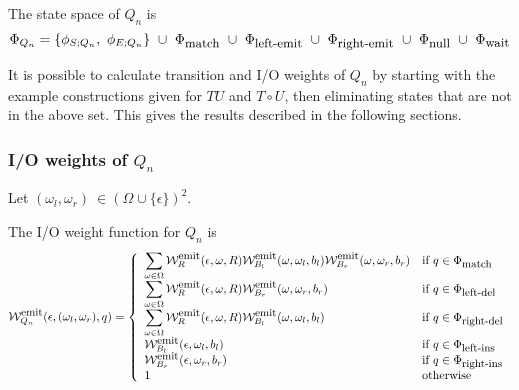 \documentclass{article}
\newcommand\gappedalphabet[1]{(\Omega_{#1} \cup \{\epsilon\})}
\newcommand\gapsquared{\gappedalphabet{}^2}
\newcommand\compose{}
\newcommand\fork{\circ}
\newcommand\States{\Phi}
\newcommand\statesof[1]{\States_{#1}}
\newcommand\startstateof[1]{\phi_{S;#1}}
\newcommand\laststateof[1]{\phi_{E;#1}}
\newcommand\weight{{\cal W}}
\newcommand\weightfunof[1]{\weight_{#1}}
\newcommand\emitweightfun[1]{\weightfunof{#1}^{\mbox{\small emit}}}
\newcommand\stateset[1]{\statesof{\mbox{\small #1}}}
\newcommand\matchsuffix{match}
\newcommand\nullsuffix{null}
\newcommand\leftinsertsuffix{left-ins}
\newcommand\rightinsertsuffix{right-ins}
\newcommand\leftdeletesuffix{left-del}
\newcommand\rightdeletesuffix{right-del}
\newcommand\leftemitsuffix{left-emit}
\newcommand\rightemitsuffix{right-emit}
\newcommand\qwaitsuffix{wait}
\newcommand\matchstates{\stateset{\matchsuffix}}
\newcommand\nullstates{\stateset{\nullsuffix}}
\newcommand\leftinsertstates{\stateset{\leftinsertsuffix}}
\newcommand\rightinsertstates{\stateset{\rightinsertsuffix}}
\newcommand\leftdeletestates{\stateset{\leftdeletesuffix}}
\newcommand\rightdeletestates{\stateset{\rightdeletesuffix}}
\newcommand\leftemitstates{\stateset{\leftemitsuffix}}
\newcommand\rightemitstates{\stateset{\rightemitsuffix}}
\newcommand\qwaitstates{\stateset{\qwaitsuffix}}
\begin{document}
The state space of $Q_n$ is
\[
\statesof{Q_n} = \{ \startstateof{Q_n},\ \laststateof{Q_n} \}\ \cup\ \matchstates\ \cup\ \leftemitstates\ \cup\ \rightemitstates\ \cup\ \nullstates\ \cup\ \qwaitstates
\]

It is possible to calculate transition and I/O weights of $Q_n$
by starting with the example constructions given for $T \compose U$ and $T \fork U$,
then eliminating states that are not in the above set.
This gives the results described in the following sections.

\subsubsection{I/O weights of $Q_n$}

Let $(\omega_l,\omega_r)\ \in \gapsquared$.

The I/O weight function for $Q_n$ is
\[
\emitweightfun{Q_n}(\epsilon,(\omega_l,\omega_r),q) = \left\{
\begin{array}{ll}
\displaystyle
\sum_{\omega \in \Omega} \emitweightfun{R}(\epsilon,\omega,R)
 \emitweightfun{B_l}(\omega,\omega_l,b_l)
 \emitweightfun{B_r}(\omega,\omega_r,b_r)
 & \mbox{if $q \in \matchstates$} \\
\displaystyle
\sum_{\omega \in \Omega} \emitweightfun{R}(\epsilon,\omega,R)
 \emitweightfun{B_r}(\omega,\omega_r,b_r)
 & \mbox{if $q \in \leftdeletestates$} \\
\displaystyle
\sum_{\omega \in \Omega} \emitweightfun{R}(\epsilon,\omega,R)
 \emitweightfun{B_l}(\omega,\omega_l,b_l)
 & \mbox{if $q \in \rightdeletestates$} \\
 \emitweightfun{B_l}(\epsilon,\omega_l,b_l)
 & \mbox{if $q \in \leftinsertstates$} \\
 \emitweightfun{B_r}(\epsilon,\omega_r,b_r)
 & \mbox{if $q \in \rightinsertstates$} \\
1
 & \mbox{otherwise}
\end{array}
\right.
\]
\end{document}
